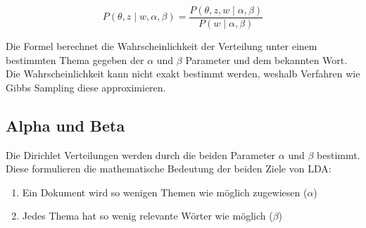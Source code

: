 \documentclass[german,version-2020-11]{uzl-thesis}
\begin{document}
\begin{center}
\begin{equation}
P(\theta, z \mid w, \alpha, \beta) = \frac{P(\theta, z, w \mid \alpha, \beta)}{P(w \mid \alpha, \beta)}
\end{equation}
\end{center}

Die Formel berechnet die Wahrscheinlichkeit der Verteilung unter einem bestimmten Thema gegeben der $\alpha$ und $\beta$ Parameter und dem bekannten Wort. Die Wahrscheinlichkeit kann nicht exakt bestimmt werden, weshalb Verfahren wie Gibbs Sampling diese approximieren.\\

\subsection{Alpha und Beta}
Die Dirichlet Verteilungen werden durch die beiden Parameter $\alpha$ und $\beta$ bestimmt. Diese formulieren die mathematische Bedeutung der beiden Ziele von LDA:

\begin{enumerate}
	\item Ein Dokument wird so wenigen Themen wie möglich zugewiesen ($\alpha$)
	\item Jedes Thema hat so wenig relevante Wörter wie möglich ($\beta$)
\end{enumerate}
\end{document}
